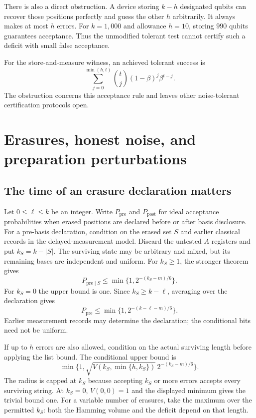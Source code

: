 \documentclass[11pt,a4paper]{article}
\newcommand{\newsection}[1]{\section{#1}}
\begin{document}
There is also a direct obstruction. A device storing $k-h$ designated qubits can recover those positions perfectly and guess the other $h$ arbitrarily. It always makes at most $h$ errors. For $k=1{,}000$ and allowance $h=10$, storing $990$ qubits guarantees acceptance. Thus the unmodified tolerant test cannot certify such a deficit with small false acceptance.

For the store-and-measure witness, an achieved tolerant success is
\[
\sum_{j=0}^{\min(h,t)}\binom tj(1-\beta)^j\beta^{t-j}.
\]
The obstruction concerns this acceptance rule and leaves other noise-tolerant certification protocols open.

\newsection{Erasures, honest noise, and preparation perturbations}
\subsection{The time of an erasure declaration matters}
Let $0\leq\ell\leq k$ be an integer. Write $P_{\mathrm{pre}}$ and $P_{\mathrm{post}}$ for ideal acceptance probabilities when erased positions are declared before or after basis disclosure. For a pre-basis declaration, condition on the erased set $S$ and earlier classical records in the delayed-measurement model. Discard the untested $A$ registers and put $k_S=k-|S|$. The surviving state may be arbitrary and mixed, but its remaining bases are independent and uniform. For $k_S\geq1$, the stronger theorem gives
\[
P_{\mathrm{pre}\mid S}\leq\min\{1,2^{-(k_S-m)/6}\}.
\]
For $k_S=0$ the upper bound is one. Since $k_S\geq k-\ell$, averaging over the declaration gives
\begin{equation}\label{eq:preloss}
P_{\mathrm{pre}}
\leq\min\{1,2^{-(k-\ell-m)/6}\}.
\end{equation}
Earlier measurement records may determine the declaration; the conditional bits need not be uniform.

If up to $h$ errors are also allowed, condition on the actual surviving length before applying the list bound. The conditional upper bound is
\[
\min\{1,\sqrt{V(k_S,\min\{h,k_S\})}\,2^{-(k_S-m)/6}\}.
\]
The radius is capped at $k_S$ because accepting $k_S$ or more errors accepts every surviving string. At $k_S=0$, $V(0,0)=1$ and the displayed minimum gives the trivial bound one. For a variable number of erasures, take the maximum over the permitted $k_S$: both the Hamming volume and the deficit depend on that length.
\end{document}
